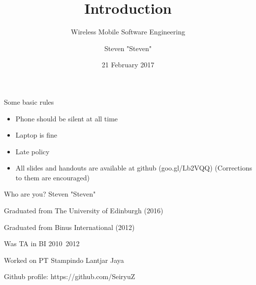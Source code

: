 \documentclass{beamer}
\title{Introduction}
\subtitle{Wireless Mobile Software Engineering}
\date{21 February 2017}
\author{Steven "Steven"}
\institute{BINUS INTERNATIONAL}
\begin{document}
  \maketitle
  
  \begin{frame}{Some basic rules}
  	\begin{itemize}
		\item Phone should be silent at all time
		\item Laptop is fine
		\item Late policy
		\item All slides and handouts are available at github (goo.gl/Lb2VQQ) (Corrections to them are encouraged)
	\end{itemize}
  \end{frame}
  
  \begin{frame}{Who are you?}
	Steven "Steven"
	
		\pause

	Graduated from The University of Edinburgh (2016)
	
	Graduated from Binus International (2012)

		\pause

	Was TA in BI 2010~2012
	
		\pause

	Worked on PT Stampindo Lantjar Jaya
	
	Github profile: https://github.com/SeiryuZ
  \end{frame}
  
\end{document}
